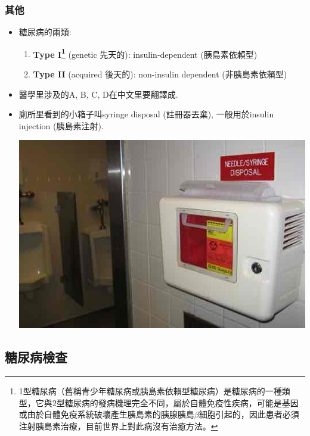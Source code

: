 \subsubsection*{其他}
\begin{itemize}
  \item 糖尿病的兩類:
  \begin{enumerate}
    \itemsep0em
    \item \textbf{Type I\footnote{1型糖尿病（舊稱青少年糖尿病或胰島素依賴型糖尿病）是糖尿病的一種類型，它與2型糖尿病的發病機理完全不同，屬於自體免疫性疾病，可能是基因或由於自體免疫系統破壞產生胰島素的胰腺胰島$\beta$細胞引起的，因此患者必須注射胰島素治療，目前世界上對此病沒有治癒方法。}} (genetic 先天的): insulin-dependent (胰島素依賴型)
    \item \textbf{Type II} (acquired 後天的): non-insulin dependent (非胰島素依賴型)
  \end{enumerate}
  \item 醫學里涉及的A, B, C, D在中文里要翻譯成.
  \item 廁所里看到的小箱子叫syringe disposal (註冊器丟棄), 一般用於insulin injection (胰島素注射).
  \begin{center}
    \includegraphics[scale=.6]{pics/syringe}
  \end{center}
\end{itemize}

\subsection{糖尿病檢查}
